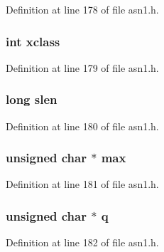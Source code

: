 Definition at line 178 of file asn1.\+h.

\subsubsection[{\texorpdfstring{xclass}{xclass}}]{\setlength{\rightskip}{0pt plus 5cm}int xclass}\hypertarget{structasn1__ctx__st_aa80351b0a17519e53a90e18c92ca7945}{}\label{structasn1__ctx__st_aa80351b0a17519e53a90e18c92ca7945}


Definition at line 179 of file asn1.\+h.

\subsubsection[{\texorpdfstring{slen}{slen}}]{\setlength{\rightskip}{0pt plus 5cm}long slen}\hypertarget{structasn1__ctx__st_ac86d4f0cab60f9deb74badbd7f64014c}{}\label{structasn1__ctx__st_ac86d4f0cab60f9deb74badbd7f64014c}


Definition at line 180 of file asn1.\+h.

\subsubsection[{\texorpdfstring{max}{max}}]{\setlength{\rightskip}{0pt plus 5cm}unsigned char $\ast$ max}\hypertarget{structasn1__ctx__st_a03b204c49bdfe16da0a2a086a4b971c9}{}\label{structasn1__ctx__st_a03b204c49bdfe16da0a2a086a4b971c9}


Definition at line 181 of file asn1.\+h.

\subsubsection[{\texorpdfstring{q}{q}}]{\setlength{\rightskip}{0pt plus 5cm}unsigned char $\ast$ q}\hypertarget{structasn1__ctx__st_affc26df06755a72577614b085b91728e}{}\label{structasn1__ctx__st_affc26df06755a72577614b085b91728e}


Definition at line 182 of file asn1.\+h.


